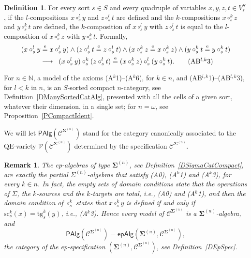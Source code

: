 \documentclass{amsart}
\theoremstyle{plain}
\newtheorem{remark}[theorem]{Remark}
\theoremstyle{definition}
\newtheorem{definition}[theorem]{Definition}
\begin{document}
\begin{definition}
For every sort $s\in S$ and every quadruple of variables $x,y,z,t\in V^{S}_{s}$, if the $l$-compositions $x\circ^{l}_{s}y$ and $z\circ^{l}_{s}t$ are defined and the $k$-compositions $x\circ^{k}_{s}z$ and $y\circ^{k}_{s}t$ are defined, the $k$-composition of $x\circ^{l}_{s}y$ with $z\circ^{l}_{s}t$ is equal to the $l$-composition of $x\circ^{k}_{s}z$ with $y\circ^{k}_{s}t$. Formally,
\allowdisplaybreaks
\begin{multline*}
(x\circ^{l}_{s}y\overset{\mathrm{e}}{=}x\circ^{l}_{s}y)
\wedge
(z\circ^{l}_{s}t\overset{\mathrm{e}}{=}z\circ^{l}_{s}t)
\wedge
(x\circ^{k}_{s}z\overset{\mathrm{e}}{=}x\circ^{k}_{s}z)
\wedge
(y\circ^{k}_{s}t\overset{\mathrm{e}}{=}y\circ^{k}_{s}t)
\\
\;\;\longrightarrow\;\;
(x\circ^{l}_{s}y)\circ^{k}_{s}(z\circ^{l}_{s}t)\overset{\mathrm{e}}{=}
(x\circ^{k}_{s}z)\circ^{l}_{s}(y\circ^{k}_{s}t).
\label{DVarCompactABlk3}\tag{AB$^{l,k}$3}
\end{multline*}

For $n\in\mathbb{N}$, a model of the axioms (A$^{k}$1)--(A$^{k}$6), for $k\in n$, and (AB$^{l,k}$1)--(AB$^{l,k}$3), for $l<k$ in $n$, is an $S$-sorted compact $n$-category, see Definition~\ref{DManySortedCatAlg}, presented with all the cells of a given sort, whatever their dimension, in a single set; for $n=\omega$, see Proposition~\ref{PCompactIdent}.

We will let $\mathsf{PAlg}(\boldsymbol{\mathcal{C}}^{\mathbf{\Sigma}^{(n)}})$ stand for the category canonically associated to the $\mathrm{QE}$-variety $\mathcal{V}(\boldsymbol{\mathcal{C}}^{\mathbf{\Sigma}^{(n)}})$ determined by the specification $\boldsymbol{\mathcal{C}}^{\mathbf{\Sigma}^{(n)}}$.
\end{definition}

\begin{remark}\label{RCompactEp}
The ep-algebras of type $\mathbf{\Sigma}^{(n)}$, see Definition~\ref{DSigmaCatCompact}, are exactly the partial $\Sigma^{(n)}$-algebras that satisfy (A0), (A$^{k}$1) and (A$^{k}$3), for every $k\in n$. In fact, the empty sets of domain conditions state that the operations of $\Sigma$, the $k$-sources and the $k$-targets are total, i.e., (A0) and (A$^{k}$1), and then the domain condition of $\circ^{k}_{s}$ states that $x\circ^{k}_{s}y$ is defined if and only if $\mathrm{sc}^{k}_{s}(x)=\mathrm{tg}^{k}_{s}(y)$, i.e., (A$^{k}$3). Hence every model of $\boldsymbol{\mathcal{C}}^{\mathbf{\Sigma}^{(n)}}$ is a $\mathbf{\Sigma}^{(n)}$-algebra, and
$$
\mathsf{PAlg}(\boldsymbol{\mathcal{C}}^{\mathbf{\Sigma}^{(n)}})=\mathsf{epAlg}(\mathbf{\Sigma}^{(n)},\mathcal{C}^{\mathbf{\Sigma}^{(n)}}),
$$
the category of the ep-specification $(\mathbf{\Sigma}^{(n)},\mathcal{C}^{\mathbf{\Sigma}^{(n)}})$, see Definition~\ref{DEpSpec}.
\end{remark}
\end{document}
